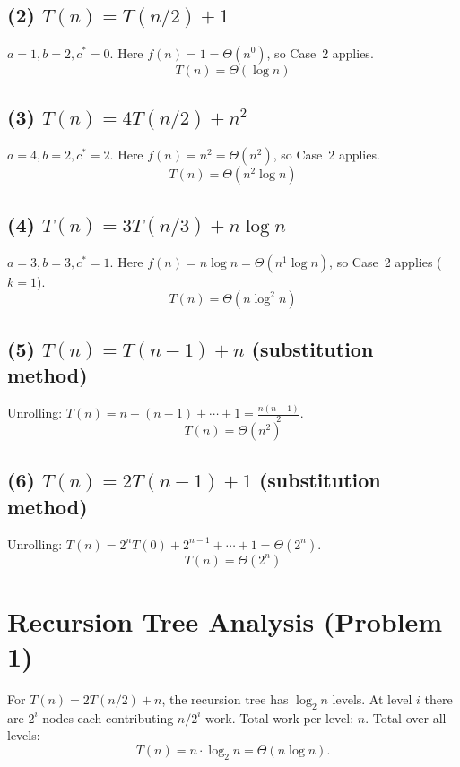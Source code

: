 \documentclass[12pt]{article}
\begin{document}
\subsection*{(2) $T(n) = T(n/2) + 1$}
$a=1, b=2, c^*=0$. Here $f(n)=1=\Theta(n^0)$, so Case~2 applies.
\[
  \boxed{T(n) = \Theta(\log n)}
\]

\subsection*{(3) $T(n) = 4T(n/2) + n^2$}
$a=4, b=2, c^*=2$. Here $f(n)=n^2=\Theta(n^2)$, so Case~2 applies.
\[
  \boxed{T(n) = \Theta(n^2 \log n)}
\]

\subsection*{(4) $T(n) = 3T(n/3) + n\log n$}
$a=3, b=3, c^*=1$. Here $f(n)=n\log n=\Theta(n^1\log n)$, so Case~2 applies ($k=1$).
\[
  \boxed{T(n) = \Theta(n \log^2 n)}
\]

\subsection*{(5) $T(n) = T(n-1) + n$ (substitution method)}
Unrolling: $T(n) = n + (n-1) + \cdots + 1 = \frac{n(n+1)}{2}$.
\[
  \boxed{T(n) = \Theta(n^2)}
\]

\subsection*{(6) $T(n) = 2T(n-1) + 1$ (substitution method)}
Unrolling: $T(n) = 2^n T(0) + 2^{n-1} + \cdots + 1 = \Theta(2^n)$.
\[
  \boxed{T(n) = \Theta(2^n)}
\]

\section{Recursion Tree Analysis (Problem 1)}

For $T(n) = 2T(n/2) + n$, the recursion tree has $\log_2 n$ levels.
At level $i$ there are $2^i$ nodes each contributing $n/2^i$ work.
Total work per level: $n$. Total over all levels:
\[
  T(n) = n \cdot \log_2 n = \Theta(n \log n).
\]
\end{document}
